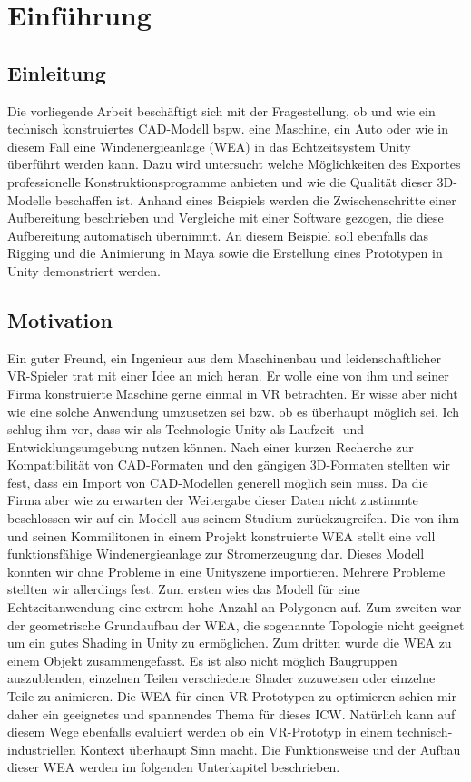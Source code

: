 \chapter{Einführung}
\section{Einleitung}
\label{sec:Einleitung}
Die vorliegende Arbeit beschäftigt sich mit der Fragestellung, ob und wie ein technisch konstruiertes CAD-Modell bspw. eine Maschine, ein Auto oder wie in diesem Fall eine Windenergieanlage (WEA) in das Echtzeitsystem Unity überführt werden kann. Dazu wird untersucht welche Möglichkeiten des Exportes professionelle Konstruktionsprogramme anbieten und wie die Qualität dieser 3D-Modelle beschaffen ist. Anhand eines Beispiels werden die Zwischenschritte einer Aufbereitung beschrieben und Vergleiche mit einer Software gezogen, die diese Aufbereitung automatisch übernimmt. An diesem Beispiel soll ebenfalls das Rigging und die Animierung in Maya sowie die Erstellung eines Prototypen in Unity demonstriert werden. 

\newpage
\section{Motivation}
\label{sec:Motivation}
Ein guter Freund, ein Ingenieur aus dem Maschinenbau und leidenschaftlicher VR-Spieler trat mit einer Idee an mich heran. Er wolle eine von ihm und seiner Firma konstruierte Maschine gerne einmal in VR betrachten. Er wisse aber nicht wie eine solche Anwendung umzusetzen sei bzw. ob es überhaupt möglich sei. Ich schlug ihm vor, dass wir als Technologie Unity als Laufzeit- und Entwicklungsumgebung nutzen können. Nach einer kurzen Recherche  zur Kompatibilität von CAD-Formaten und den gängigen 3D-Formaten stellten wir fest, dass ein Import von CAD-Modellen generell möglich sein muss. Da die Firma aber wie zu erwarten der Weitergabe dieser Daten nicht zustimmte beschlossen wir auf ein Modell aus seinem Studium zurückzugreifen. Die von ihm und seinen Kommilitonen in einem Projekt konstruierte WEA stellt eine voll funktionsfähige Windenergieanlage zur Stromerzeugung dar. Dieses Modell konnten wir ohne Probleme in eine Unityszene importieren. Mehrere Probleme stellten wir allerdings fest. Zum ersten wies das Modell für eine Echtzeitanwendung eine extrem hohe  Anzahl an Polygonen auf. Zum zweiten war der geometrische Grundaufbau der WEA, die sogenannte Topologie nicht geeignet um ein gutes Shading in Unity zu ermöglichen. Zum dritten wurde die WEA zu einem Objekt zusammengefasst. Es ist also nicht möglich Baugruppen auszublenden, einzelnen Teilen verschiedene Shader zuzuweisen oder einzelne Teile zu animieren. Die WEA für einen VR-Prototypen zu optimieren schien mir daher ein geeignetes und spannendes Thema für dieses ICW. Natürlich kann auf diesem Wege ebenfalls evaluiert werden ob ein VR-Prototyp in einem technisch-industriellen Kontext überhaupt Sinn macht.  Die Funktionsweise und der Aufbau dieser WEA werden im folgenden Unterkapitel  beschrieben.

